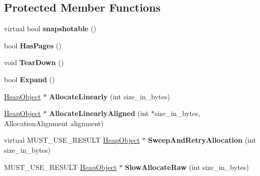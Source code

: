 \subsection*{Protected Member Functions}
\begin{DoxyCompactItemize}
\item 
virtual bool {\bfseries snapshotable} ()\hypertarget{classv8_1_1internal_1_1_paged_space_aeb0dd24b678bc4f2f70b54e86de0cd66}{}\label{classv8_1_1internal_1_1_paged_space_aeb0dd24b678bc4f2f70b54e86de0cd66}

\item 
bool {\bfseries Has\+Pages} ()\hypertarget{classv8_1_1internal_1_1_paged_space_ae922e0aa9f3dec8c7b3f3c86d78340a2}{}\label{classv8_1_1internal_1_1_paged_space_ae922e0aa9f3dec8c7b3f3c86d78340a2}

\item 
void {\bfseries Tear\+Down} ()\hypertarget{classv8_1_1internal_1_1_paged_space_aff48f83009c4b8429f3e3263d2b3da32}{}\label{classv8_1_1internal_1_1_paged_space_aff48f83009c4b8429f3e3263d2b3da32}

\item 
bool {\bfseries Expand} ()\hypertarget{classv8_1_1internal_1_1_paged_space_a72b12619f3f5da63cf74e17043a9a294}{}\label{classv8_1_1internal_1_1_paged_space_a72b12619f3f5da63cf74e17043a9a294}

\item 
\hyperlink{classv8_1_1internal_1_1_heap_object}{Heap\+Object} $\ast$ {\bfseries Allocate\+Linearly} (int size\+\_\+in\+\_\+bytes)\hypertarget{classv8_1_1internal_1_1_paged_space_a4f721427d9246676c4d3223df775c815}{}\label{classv8_1_1internal_1_1_paged_space_a4f721427d9246676c4d3223df775c815}

\item 
\hyperlink{classv8_1_1internal_1_1_heap_object}{Heap\+Object} $\ast$ {\bfseries Allocate\+Linearly\+Aligned} (int $\ast$size\+\_\+in\+\_\+bytes, Allocation\+Alignment alignment)\hypertarget{classv8_1_1internal_1_1_paged_space_a8cd7da9902155a686193173de45a10bc}{}\label{classv8_1_1internal_1_1_paged_space_a8cd7da9902155a686193173de45a10bc}

\item 
virtual M\+U\+S\+T\+\_\+\+U\+S\+E\+\_\+\+R\+E\+S\+U\+LT \hyperlink{classv8_1_1internal_1_1_heap_object}{Heap\+Object} $\ast$ {\bfseries Sweep\+And\+Retry\+Allocation} (int size\+\_\+in\+\_\+bytes)\hypertarget{classv8_1_1internal_1_1_paged_space_a67fbd652d4222e0d01ab8c6802ae11ac}{}\label{classv8_1_1internal_1_1_paged_space_a67fbd652d4222e0d01ab8c6802ae11ac}

\item 
M\+U\+S\+T\+\_\+\+U\+S\+E\+\_\+\+R\+E\+S\+U\+LT \hyperlink{classv8_1_1internal_1_1_heap_object}{Heap\+Object} $\ast$ {\bfseries Slow\+Allocate\+Raw} (int size\+\_\+in\+\_\+bytes)\hypertarget{classv8_1_1internal_1_1_paged_space_ab58832c0ced766184b9b8bd414ef2391}{}\label{classv8_1_1internal_1_1_paged_space_ab58832c0ced766184b9b8bd414ef2391}

\end{DoxyCompactItemize}
